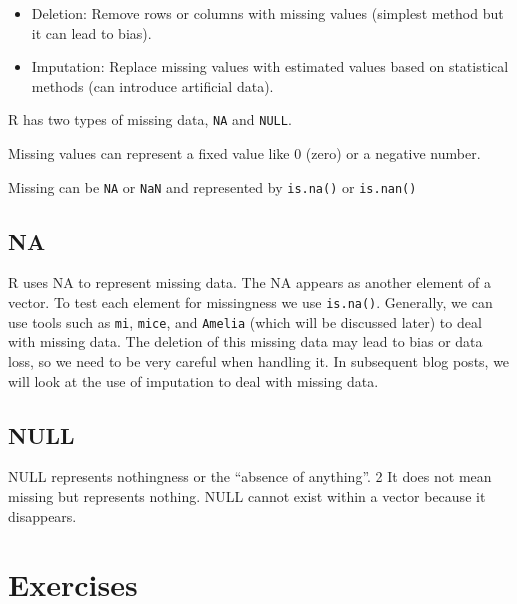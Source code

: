 \documentclass[
  letterpaper,
  DIV=11,
  numbers=noendperiod]{scrreprt}
\begin{document}
\begin{itemize}
\item
  Deletion: Remove rows or columns with missing values (simplest method
  but it can lead to bias).
\item
  Imputation: Replace missing values with estimated values based on
  statistical methods (can introduce artificial data).
\end{itemize}

R has two types of missing data, \texttt{NA} and \texttt{NULL}.

Missing values can represent a fixed value like 0 (zero) or a negative
number.

Missing can be \texttt{NA} or \texttt{NaN} and represented by
\texttt{is.na()} or \texttt{is.nan()}

\subsection{NA}\label{na}

R uses NA to represent missing data. The NA appears as another element
of a vector. To test each element for missingness we use
\texttt{is.na()}. Generally, we can use tools such as \texttt{mi},
\texttt{mice}, and \texttt{Amelia} (which will be discussed later) to
deal with missing data. The deletion of this missing data may lead to
bias or data loss, so we need to be very careful when handling it. In
subsequent blog posts, we will look at the use of imputation to deal
with missing data.

\subsection{NULL}\label{null}

NULL represents nothingness or the ``absence of anything''. 2 It does
not mean missing but represents nothing. NULL cannot exist within a
vector because it disappears.

\section{Exercises}\label{exercises-11}
\end{document}
